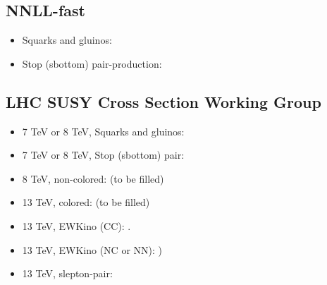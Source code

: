 \documentclass{article}
\begin{document}
\subsection*{NNLL-fast}
\begin{itemize}
 \item Squarks and gluinos:\cite{NNLLfastWeb,Beenakker:2016lwe,Beenakker:1996ch,Kulesza:2008jb,Kulesza:2009kq,Beenakker:2009ha,Beenakker:2011sf,Beenakker:2013mva,Beenakker:2014sma}
 \item Stop (sbottom) pair-production: \cite{NNLLfastWeb,Beenakker:2016lwe,Beenakker:1997ut,Beenakker:2010nq,Beenakker:2016gmf}
\end{itemize}


\subsection*{LHC SUSY Cross Section Working Group}
\begin{itemize}
 \item 7 TeV or 8 TeV, Squarks and gluinos:
       \cite{Kramer:2012bx,LHCSUSYCSWG,NLLfastWeb,Beenakker:1996ch,Kulesza:2008jb,Kulesza:2009kq,Beenakker:2009ha,Beenakker:2011fu}
 \item 7 TeV or 8 TeV, Stop (sbottom) pair:
       \cite{Kramer:2012bx,LHCSUSYCSWG,NLLfastWeb,Beenakker:1997ut,Beenakker:2010nq,Beenakker:2011fu}
 \item 8 TeV, non-colored: (to be filled)
 \item 13 TeV, colored: (to be filled)
 \item 13 TeV, EWKino (CC): \cite{Debove:2010kf,Fuks:2012qx,Fuks:2013vua}.
 \item 13 TeV, EWKino (NC or NN): \cite{Debove:2010kf,Fuks:2012qx,Fuks:2013vua,Fiaschi:2018hgm})
 \item 13 TeV, slepton-pair: \cite{Bozzi:2007qr,Fuks:2013vua,Fuks:2013lya,Fiaschi:2018xdm}
\end{itemize}


{\footnotesize }
\end{document}
